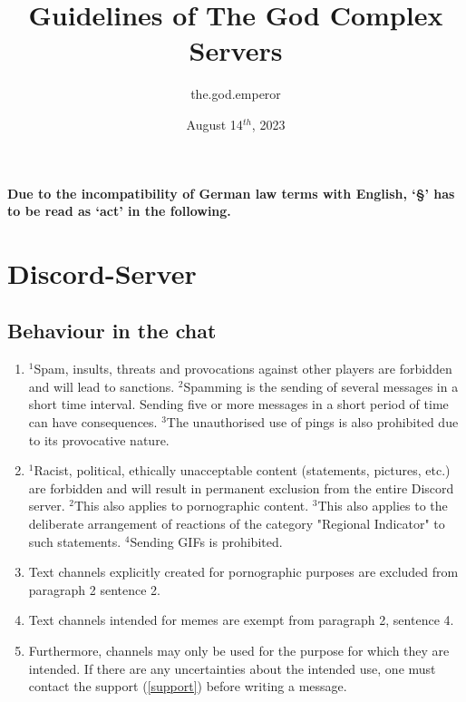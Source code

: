 \documentclass{article}
\title{Guidelines of The God Complex Servers}
\author{the.god.emperor}
\date{August 14$^{th}$, 2023}
\begin{document}
\maketitle
\newpage
\tableofcontents
\newpage
\paragraph*{Due to the incompatibility of German law terms with English, `§' has to be read as `act' in the following.}

\section{Discord-Server}
\subsection{Behaviour in the chat}\label{verhalten}
\begin{enumerate}[(1)]
	\item $^{1}$Spam, insults, threats and provocations against other players are forbidden and will lead to sanctions. $^{2}$Spamming is the sending of several messages in a short time interval. Sending five or more messages in a short period of time can have consequences. $^{3}$The unauthorised use of pings is also prohibited due to its provocative nature.
	\item $^{1}$Racist, political, ethically unacceptable content (statements, pictures, etc.) are forbidden and will result in permanent exclusion from the entire Discord server. $^{2}$This also applies to pornographic content. $^{3}$This also applies to the deliberate arrangement of reactions of the category "Regional Indicator" to such statements. $^{4}$Sending GIFs is prohibited.
	\item Text channels explicitly created for pornographic purposes are excluded from paragraph 2 sentence 2.
	\item Text channels intended for memes are exempt from paragraph 2, sentence 4.
	\item Furthermore, channels may only be used for the purpose for which they are intended. If there are any uncertainties about the intended use, one must contact the support (\ref{support}) before writing a message.
\end{enumerate}
\end{document}
